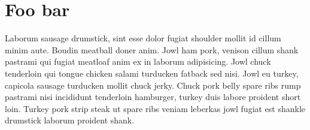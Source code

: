 \chapter{Foo bar} %
\label{cha:foo_bar}

Laborum sausage drumstick, sint esse dolor fugiat shoulder mollit id cillum minim aute. Boudin meatball doner anim. Jowl ham pork, venison cillum shank pastrami qui fugiat meatloaf anim ex in laborum adipisicing. Jowl chuck tenderloin qui tongue chicken salami turducken fatback sed nisi. Jowl eu turkey, capicola sausage turducken mollit chuck jerky. Chuck pork belly spare ribs rump pastrami nisi incididunt tenderloin hamburger, turkey duis labore proident short loin. Turkey pork strip steak ut spare ribs veniam leberkas jowl fugiat est shankle drumstick laborum proident shank.


